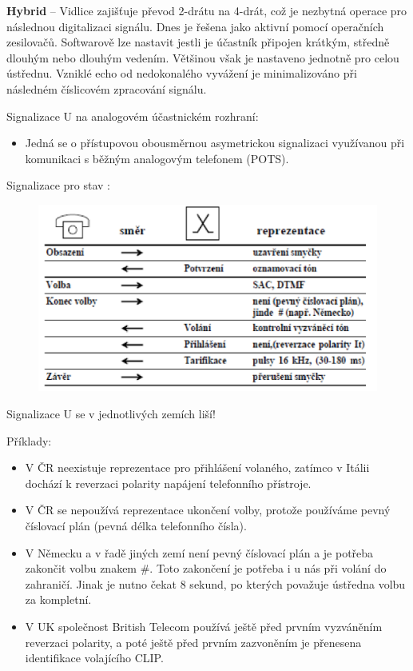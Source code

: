 \noindent\textbf{Hybrid} -- Vidlice zajišťuje převod 2-drátu na 4-drát, což je nezbytná operace pro následnou digitalizaci signálu. Dnes je řešena jako aktivní pomocí operačních zesilovačů. Softwarově lze nastavit jestli je účastník připojen krátkým, středně dlouhým nebo dlouhým vedením. Většinou však je nastaveno jednotně pro celou ústřednu. Vzniklé echo od nedokonalého vyvážení je minimalizováno při následném číslicovém zpracování signálu.


Signalizace U na analogovém účastnickém rozhraní:
\begin{itemize}[noitemsep]
    \item Jedná se o přístupovou obousměrnou asymetrickou signalizaci využívanou při komunikaci s běžným analogovým telefonem (POTS).
\end{itemize}

\noindent Signalizace pro stav :
\begin{figure}[h!]
    \begin{center}
        \includegraphics[width=\textwidth]{images/otazka16.png}
        \label{img:7}
    \end{center}
\end{figure}

\noindent Signalizace U se v jednotlivých zemích liší!

\noindent Příklady:
\begin{itemize}[noitemsep]
    \item V ČR neexistuje reprezentace pro přihlášení volaného, zatímco v Itálii dochází k reverzaci polarity napájení telefonního přístroje.
    \item V ČR se nepoužívá reprezentace ukončení volby, protože používáme pevný číslovací plán (pevná délka telefonního čísla).
    \item V Německu a v řadě jiných zemí není pevný číslovací plán a je potřeba zakončit volbu znakem \#. Toto zakončení je potřeba i u nás při volání do zahraničí. Jinak je nutno čekat 8 sekund, po kterých považuje ústředna volbu za kompletní.
    \item V UK společnost British Telecom používá ještě před prvním vyzváněním reverzaci polarity, a poté ještě před prvním zazvoněním je přenesena identifikace volajícího CLIP.
\end{itemize}


